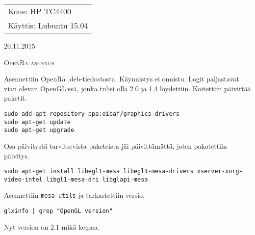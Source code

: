 \documentclass[main.tex]{subfiles}
\begin{document}
\lstset{language=sh}
\thispagestyle{empty}
\begin{tabular}[t]{l}
Kone: HP TC4400\\
Käyttis: Lubuntu 15.04
\end{tabular}
\hfill 20.11.2015

{\scshape\Large{OpenRa asennus}}

Asennettiin OpenRa .deb-tiedostosta. Käynnistys ei onnistu. Logit paljastavat vian olevan OpenGL:ssä, jonka tulisi olla 2.0 ja 1.4 löydettiin. Koitettiin päivittää paketit.

\begin{lstlisting}
sudo add-apt-repository ppa:oibaf/graphics-drivers
sudo apt-get update
sudo apt-get upgrade
\end{lstlisting}

Osa päivitystä tarvitsevista paketeista jäi päivittämättä, joten pakotettiin päivitys.

\begin{lstlisting}
sudo apt-get install libegl1-mesa libegl1-mesa-drivers xserver-xorg-video-intel libgl1-mesa-dri libglapi-mesa 
\end{lstlisting}

Asennettiin \texttt{mesa-utils} ja tarkastettiin versio.

\begin{lstlisting}
glxinfo | grep "OpenGL version"
\end{lstlisting}

Nyt version on 2.1 mikä kelpaa.
\end{document}
